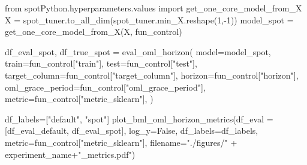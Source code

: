 \documentclass[
  letterpaper,
  DIV=11,
  numbers=noendperiod]{scrreprt}
\newenvironment{Shaded}{\begin{snugshade}}{\end{snugshade}}
\newcommand{\DecValTok}[1]{\textcolor[rgb]{0.68,0.00,0.00}{#1}}
\newcommand{\ImportTok}[1]{\textcolor[rgb]{0.00,0.46,0.62}{#1}}
\newcommand{\NormalTok}[1]{\textcolor[rgb]{0.00,0.23,0.31}{#1}}
\newcommand{\OperatorTok}[1]{\textcolor[rgb]{0.37,0.37,0.37}{#1}}
\newcommand{\StringTok}[1]{\textcolor[rgb]{0.13,0.47,0.30}{#1}}
\newcommand{\VariableTok}[1]{\textcolor[rgb]{0.07,0.07,0.07}{#1}}
\begin{document}
\begin{Shaded}
\begin{Highlighting}[]
\ImportTok{from}\NormalTok{ spotPython.hyperparameters.values }\ImportTok{import}\NormalTok{ get\_one\_core\_model\_from\_X}
\NormalTok{X }\OperatorTok{=}\NormalTok{ spot\_tuner.to\_all\_dim(spot\_tuner.min\_X.reshape(}\DecValTok{1}\NormalTok{,}\OperatorTok{{-}}\DecValTok{1}\NormalTok{))}
\NormalTok{model\_spot }\OperatorTok{=}\NormalTok{ get\_one\_core\_model\_from\_X(X, fun\_control)}
\end{Highlighting}
\end{Shaded}

\begin{Shaded}
\begin{Highlighting}[]
\NormalTok{df\_eval\_spot, df\_true\_spot }\OperatorTok{=}\NormalTok{ eval\_oml\_horizon(}
\NormalTok{                    model}\OperatorTok{=}\NormalTok{model\_spot,}
\NormalTok{                    train}\OperatorTok{=}\NormalTok{fun\_control[}\StringTok{"train"}\NormalTok{],}
\NormalTok{                    test}\OperatorTok{=}\NormalTok{fun\_control[}\StringTok{"test"}\NormalTok{],}
\NormalTok{                    target\_column}\OperatorTok{=}\NormalTok{fun\_control[}\StringTok{"target\_column"}\NormalTok{],}
\NormalTok{                    horizon}\OperatorTok{=}\NormalTok{fun\_control[}\StringTok{"horizon"}\NormalTok{],}
\NormalTok{                    oml\_grace\_period}\OperatorTok{=}\NormalTok{fun\_control[}\StringTok{"oml\_grace\_period"}\NormalTok{],}
\NormalTok{                    metric}\OperatorTok{=}\NormalTok{fun\_control[}\StringTok{"metric\_sklearn"}\NormalTok{],}
\NormalTok{                )}
\end{Highlighting}
\end{Shaded}

\begin{Shaded}
\begin{Highlighting}[]
\NormalTok{df\_labels}\OperatorTok{=}\NormalTok{[}\StringTok{"default"}\NormalTok{, }\StringTok{"spot"}\NormalTok{]}
\NormalTok{plot\_bml\_oml\_horizon\_metrics(df\_eval }\OperatorTok{=}\NormalTok{ [df\_eval\_default, df\_eval\_spot], log\_y}\OperatorTok{=}\VariableTok{False}\NormalTok{, df\_labels}\OperatorTok{=}\NormalTok{df\_labels, metric}\OperatorTok{=}\NormalTok{fun\_control[}\StringTok{"metric\_sklearn"}\NormalTok{], filename}\OperatorTok{=}\StringTok{"./figures/"} \OperatorTok{+}\NormalTok{ experiment\_name}\OperatorTok{+}\StringTok{"\_metrics.pdf"}\NormalTok{)}
\end{Highlighting}
\end{Shaded}
\end{document}
